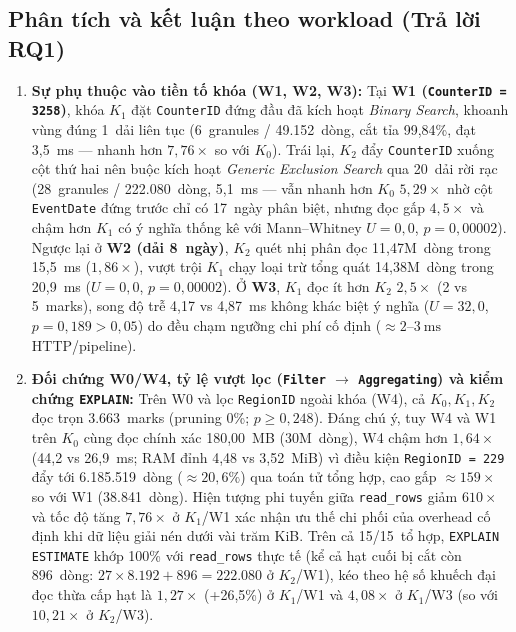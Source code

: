 \documentclass[13pt,a4paper]{report}
\begin{document}
\subsection{Phân tích và kết luận theo workload (Trả lời RQ1)}
\begin{enumerate}
    \setlength{\itemsep}{3pt}\setlength{\parskip}{0pt}
    \item \textbf{Sự phụ thuộc vào tiền tố khóa (W1, W2, W3):} Tại \textbf{W1 (\texttt{CounterID = 3258})}, khóa $K_1$ đặt \texttt{CounterID} đứng đầu đã kích hoạt \textit{Binary Search}, khoanh vùng đúng 1~dải liên tục (6~granules / 49.152~dòng, cắt tỉa 99,84\%, đạt 3,5~ms --- nhanh hơn $7{,}76{\times}$ so với $K_0$). Trái lại, $K_2$ đẩy \texttt{CounterID} xuống cột thứ hai nên buộc kích hoạt \textit{Generic Exclusion Search} qua 20~dải rời rạc (28~granules / 222.080~dòng, 5,1~ms --- vẫn nhanh hơn $K_0$ $5{,}29{\times}$ nhờ cột \texttt{EventDate} đứng trước chỉ có 17~ngày phân biệt, nhưng đọc gấp $4{,}5{\times}$ và chậm hơn $K_1$ có ý nghĩa thống kê với Mann--Whitney $U = 0{,}0$, $p = 0{,}00002$). Ngược lại ở \textbf{W2 (dải 8~ngày)}, $K_2$ quét nhị phân đọc 11,47M~dòng trong 15,5~ms ($1{,}86{\times}$), vượt trội $K_1$ chạy loại trừ tổng quát 14,38M~dòng trong 20,9~ms ($U = 0{,}0$, $p = 0{,}00002$). Ở \textbf{W3}, $K_1$ đọc ít hơn $K_2$ $2{,}5{\times}$ (2 vs 5~marks), song độ trễ 4,17 vs 4,87~ms không khác biệt ý nghĩa ($U = 32{,}0$, $p = 0{,}189 > 0{,}05$) do đều chạm ngưỡng chi phí cố định ($\approx 2\text{--}3~\text{ms}$ HTTP/pipeline).
    \item \textbf{Đối chứng W0/W4, tỷ lệ vượt lọc (\texttt{Filter} $\rightarrow$ \texttt{Aggregating}) và kiểm chứng \texttt{EXPLAIN}:} Trên W0 và lọc \texttt{RegionID} ngoài khóa (W4), cả $K_0, K_1, K_2$ đọc trọn 3.663~marks (pruning 0\%; $p \ge 0{,}248$). Đáng chú ý, tuy W4 và W1 trên $K_0$ cùng đọc chính xác 180,00~MB (30M~dòng), W4 chậm hơn $1{,}64{\times}$ (44,2 vs 26,9~ms; RAM đỉnh 4,48 vs 3,52~MiB) vì điều kiện \texttt{RegionID = 229} đẩy tới 6.185.519~dòng ($\approx 20{,}6\%$) qua toán tử tổng hợp, cao gấp $\approx 159{\times}$ so với W1 (38.841~dòng). Hiện tượng phi tuyến giữa \texttt{read\_\allowbreak{}rows} giảm $610{\times}$ và tốc độ tăng $7{,}76{\times}$ ở $K_1$/W1 xác nhận ưu thế chi phối của overhead cố định khi dữ liệu giải nén dưới vài trăm KiB. Trên cả 15/15~tổ hợp, \texttt{EXPLAIN ESTIMATE} khớp 100\% với \texttt{read\_\allowbreak{}rows} thực tế (kể cả hạt cuối bị cắt còn 896~dòng: $27 \times 8.192 + 896 = 222.080$ ở $K_2$/W1), kéo theo hệ số khuếch đại đọc thừa cấp hạt là $1{,}27{\times}$ (+26,5\%) ở $K_1$/W1 và $4{,}08{\times}$ ở $K_1$/W3 (so với $10{,}21{\times}$ ở $K_2$/W3).

\end{enumerate}
\end{document}

